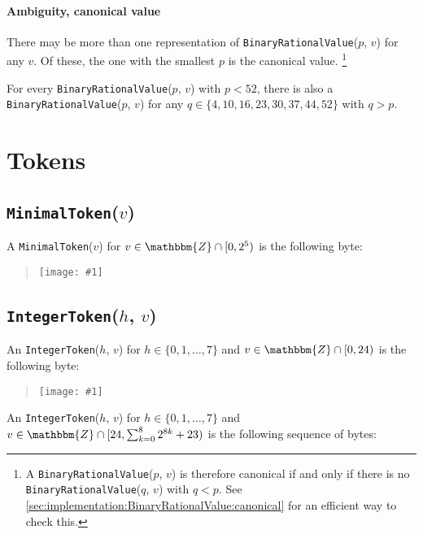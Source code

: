 \documentclass{dbor-article}
\newcommand{\SetOfIntegers}{\mathbbm{Z}}
\newcommand{\DborSyntaxIdent}[1]{\texttt{#1}}
\newcommand{\IncludeImageInPlace}[1]{%
        \begin{quotation}%
            \texttt{[image: \#1]}%
        \end{quotation}%
    }
\begin{document}
    \paragraph{Ambiguity, canonical value}

    There may be more than one representation of \DborSyntaxIdent{Binary\-Rational\-Value}($p$, $v$) for any $v$.
    Of these, the one with the smallest $p$ is the canonical value.%
    \footnote{
        A \DborSyntaxIdent{BinaryRationalValue}($p$, $v$) is therefore canonical if and only if there is
        no \DborSyntaxIdent{BinaryRationalValue}($q$, $v$) with $q < p$.
        See \ref{sec:implementation:BinaryRationalValue:canonical} for an efficient way to check this.
    }
    
    For every \DborSyntaxIdent{Binary\-Rational\-Value}($p$, $v$) with $p < 52$, there is also
    a \DborSyntaxIdent{Binary\-Rational\-Value}($p$, $v$) for any
    $q \in \{4, 10, 16, 23, 30, 37, 44, 52\}$ with $q > p$.

    
    \section{Tokens}
    \label{sec:tokens}

    \subsection{\DborSyntaxIdent{MinimalToken}($v$)}
    \hypertarget{sec:def:MinimalToken}{}

    A \DborSyntaxIdent{MinimalToken}($v$) for $v \in \SetOfIntegers \cap [0, 2^5)$
    is the following byte:

    \IncludeImageInPlace{MinimalToken}


    \subsection{\DborSyntaxIdent{IntegerToken}($h$, $v$)}
    \hypertarget{sec:def:IntegerToken}{}

    An \DborSyntaxIdent{IntegerToken}($h$, $v$) for $h \in \{0, 1, \ldots, 7\}$ and
    $v \in \SetOfIntegers \cap [0, 24)$ is the following byte:

    \IncludeImageInPlace{IntegerTokenA}
    
    An \DborSyntaxIdent{IntegerToken}($h$, $v$) for $h \in \{0, 1, \ldots, 7\}$ and
    $v \in \SetOfIntegers \cap [24, \sum_{k = 0}^8 2^{8k} + 23)$
    is the following sequence of bytes:
\end{document}
